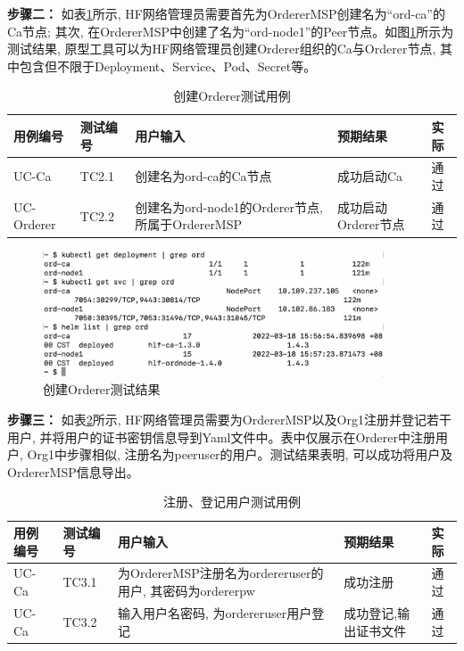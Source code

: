 \textbf{步骤二：} 如表\ref{orderer_test}所示, HF网络管理员需要首先为OrdererMSP创建名为“ord-ca”的Ca节点; 其次, 在OrdererMSP中创建了名为“ord-node1”的Peer节点。如图\ref{testcase2result}所示为测试结果, 原型工具可以为HF网络管理员创建Orderer组织的Ca与Orderer节点, 其中包含但不限于Deployment、Service、Pod、Secret等。

{\footnotesize
\begin{longtable}[h]{m{45pt} m{45pt} m{180pt} m{50pt} m{20pt}}
    \caption[创建Orderer测试用例]{创建Orderer测试用例} \label{orderer_test}\\
        \toprule  
        \textbf{用例编号}&\textbf{测试编号}&\textbf{用户输入}&\textbf{预期结果}&\textbf{实际}\\
        \hline
        UC-Ca & TC2.1 & 创建名为ord-ca的Ca节点 & 成功启动Ca & 通过 \\
        \hline
        UC-Orderer & TC2.2 & 创建名为ord-node1的Orderer节点, 所属于OrdererMSP & 成功启动Orderer节点 & 通过 \\
        \bottomrule
    \end{longtable} 
}

\begin{figure}[h] %
    \centering %
    \includegraphics[width=0.9\textwidth]{FIGs/chapter6/orderer.png} %
    \caption{创建Orderer测试结果} %
    \label{testcase2result} %
\end{figure}%

\textbf{步骤三：} 如表\ref{reg_enroll_test}所示, HF网络管理员需要为OrdererMSP以及Org1注册并登记若干用户, 并将用户的证书密钥信息导到Yaml文件中。表中仅展示在Orderer中注册用户, Org1中步骤相似, 注册名为peeruser的用户。测试结果表明, 可以成功将用户及OrdererMSP信息导出。

{\footnotesize
\begin{longtable}[h]{m{45pt} m{45pt} m{180pt} m{50pt} m{20pt}}
    \caption[注册、登记用户测试用例]{注册、登记用户测试用例} \label{reg_enroll_test}\\
        \toprule  
        \textbf{用例编号}&\textbf{测试编号}&\textbf{用户输入}&\textbf{预期结果}&\textbf{实际}\\
        \hline
        UC-Ca & TC3.1 & 为OrdererMSP注册名为ordereruser的用户, 其密码为ordererpw & 成功注册 & 通过 \\
        \hline
        UC-Ca & TC3.2 & 输入用户名密码, 为ordereruser用户登记 & 成功登记,输出证书文件 & 通过 \\
        \bottomrule
    \end{longtable} 
}

